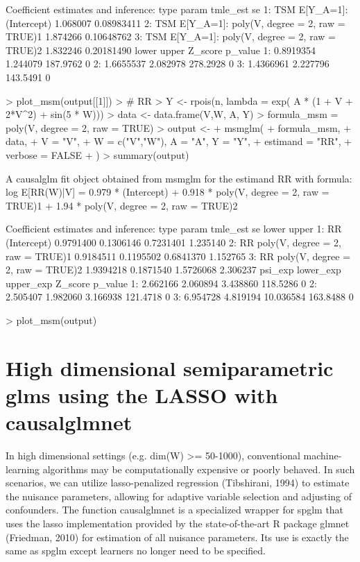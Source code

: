 \documentclass[article]{jss}
\begin{document}
\begin{Schunk}
\begin{Soutput}
Coefficient estimates and inference:
   type                                        param tmle_est         se
1:  TSM                      E[Y_{A=1}]: (Intercept) 1.068007 0.08983411
2:  TSM E[Y_{A=1}]: poly(V, degree = 2, raw = TRUE)1 1.874266 0.10648762
3:  TSM E[Y_{A=1}]: poly(V, degree = 2, raw = TRUE)2 1.832246 0.20181490
       lower    upper  Z_score p_value
1: 0.8919354 1.244079 187.9762       0
2: 1.6655537 2.082978 278.2928       0
3: 1.4366961 2.227796 143.5491       0
\end{Soutput}
\begin{Sinput}
>  plot_msm(output[[1]])
> # RR
> Y <- rpois(n, lambda = exp( A * (1 + V + 2*V^2)  + sin(5 * W)))
> data <- data.frame(V,W, A, Y)
> formula_msm = ~ poly(V, degree = 2, raw = TRUE) 
> output <-
+   msmglm(
+     formula_msm,
+     data,
+     V = "V",
+     W = c("V","W"), A = "A", Y = "Y",
+     estimand = "RR",
+     verbose = FALSE
+   )
> summary(output)
\end{Sinput}
\begin{Soutput}
A causalglm fit object obtained from msmglm for the estimand RR with formula: 
log E[RR(W)|V] = 0.979 * (Intercept) + 0.918 * poly(V, degree = 2, raw = TRUE)1 + 1.94 * poly(V, degree = 2, raw = TRUE)2

Coefficient estimates and inference:
   type                            param  tmle_est        se     lower    upper
1:   RR                      (Intercept) 0.9791400 0.1306146 0.7231401 1.235140
2:   RR poly(V, degree = 2, raw = TRUE)1 0.9184511 0.1195502 0.6841370 1.152765
3:   RR poly(V, degree = 2, raw = TRUE)2 1.9394218 0.1871540 1.5726068 2.306237
    psi_exp lower_exp upper_exp  Z_score p_value
1: 2.662166  2.060894  3.438860 118.5286       0
2: 2.505407  1.982060  3.166938 121.4718       0
3: 6.954728  4.819194 10.036584 163.8488       0
\end{Soutput}
\begin{Sinput}
> plot_msm(output)
\end{Sinput}
\end{Schunk}


\section{High dimensional semiparametric glms using the LASSO with causalglmnet}
In high dimensional settings (e.g. dim(W) >= 50-1000), conventional machine-learning algorithms may be computationally expensive or poorly behaved. In such scenarios, we can utilize lasso-penalized regression (Tibshirani, 1994) to estimate the nuisance parameters, allowing for adaptive variable selection and adjusting of confounders. The function causalglmnet is a specialized wrapper for spglm that uses the lasso implementation provided by the state-of-the-art R package glmnet (Friedman, 2010) for estimation of all nuisance parameters.\nocite{Friedman2010}\nocite{Tibshirani94regressionshrinkage} Its use is exactly the same as spglm except learners no longer need to be specified.
\end{document}
